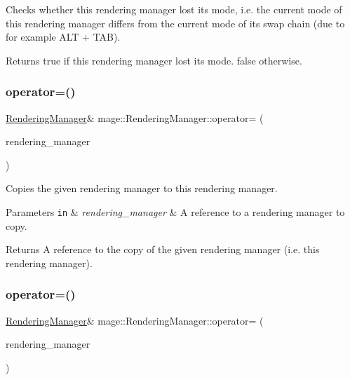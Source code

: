 Checks whether this rendering manager lost its mode, i.\+e. the current mode of this rendering manager differs from the current mode of its swap chain (due to for example A\+LT + T\+AB).

\begin{DoxyReturn}{Returns}
{\ttfamily true} if this rendering manager lost its mode. {\ttfamily false} otherwise. 
\end{DoxyReturn}
\hypertarget{classmage_1_1_rendering_manager_af34a5ba3b8b585124f84f4c70866546b}{}\label{classmage_1_1_rendering_manager_af34a5ba3b8b585124f84f4c70866546b} 
\subsubsection{\texorpdfstring{operator=()}{operator=()}\hspace{0.1cm}{\footnotesize\ttfamily [1/2]}}
{\footnotesize\ttfamily \hyperlink{classmage_1_1_rendering_manager}{Rendering\+Manager}\& mage\+::\+Rendering\+Manager\+::operator= (\begin{DoxyParamCaption}\item[{const \hyperlink{classmage_1_1_rendering_manager}{Rendering\+Manager} \&}]{rendering\+\_\+manager }\end{DoxyParamCaption})\hspace{0.3cm}{\ttfamily [delete]}}

Copies the given rendering manager to this rendering manager.


\begin{DoxyParams}[1]{Parameters}
\mbox{\tt in}  & {\em rendering\+\_\+manager} & A reference to a rendering manager to copy. \\
\hline
\end{DoxyParams}
\begin{DoxyReturn}{Returns}
A reference to the copy of the given rendering manager (i.\+e. this rendering manager). 
\end{DoxyReturn}
\hypertarget{classmage_1_1_rendering_manager_a6f71bc364063de61d07490ef9896158c}{}\label{classmage_1_1_rendering_manager_a6f71bc364063de61d07490ef9896158c} 
\subsubsection{\texorpdfstring{operator=()}{operator=()}\hspace{0.1cm}{\footnotesize\ttfamily [2/2]}}
{\footnotesize\ttfamily \hyperlink{classmage_1_1_rendering_manager}{Rendering\+Manager}\& mage\+::\+Rendering\+Manager\+::operator= (\begin{DoxyParamCaption}\item[{\hyperlink{classmage_1_1_rendering_manager}{Rendering\+Manager} \&\&}]{rendering\+\_\+manager }\end{DoxyParamCaption})\hspace{0.3cm}{\ttfamily [delete]}}

